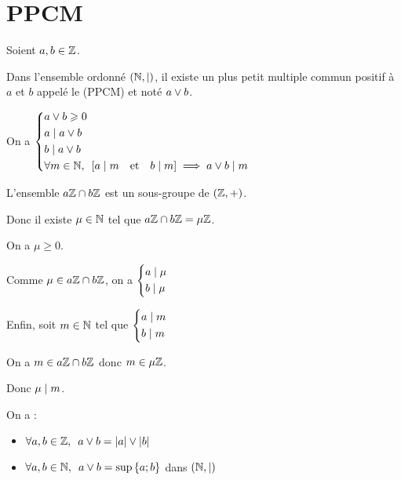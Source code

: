 \section{PPCM}

\begin{defprop}
Soient \(a,b\in\mathbb{Z}\).

Dans l'ensemble ordonné \(\groupe{\N}[\divise]\), il existe un plus petit multiple commun positif à \(a\) et \(b\) appelé le  (PPCM) et noté \(a\lor b\).

On a \(\begin{dcases}a\ou b\geq0 \\ a\divise a\ou b \\ b\divise a\ou b \\ \quantifs{\forall m\in\N}\croch{a\divise m\quad\text{et}\quad b\divise m}\imp a\ou b\divise m\end{dcases}\)
\end{defprop}

\begin{dem}
L'ensemble \(a\mathbb{Z}\cap b\mathbb{Z}\) est un sous-groupe de \(\groupe{\Z}\).

Donc il existe \(\mu\in\mathbb{N}\) tel que \(a\mathbb{Z}\cap b\mathbb{Z}=\mu\mathbb{Z}\).

On a \(\mu\geq0\).

Comme \(\mu\in a\mathbb{Z}\cap b\mathbb{Z}\), on a \(\begin{dcases}a\mid\mu \\ b\mid\mu\end{dcases}\)

Enfin, soit \(m\in\mathbb{N}\) tel que \(\begin{dcases}a\mid m \\ b\mid m\end{dcases}\)

On a \(m\in a\mathbb{Z}\cap b\mathbb{Z}\) donc \(m\in\mu\mathbb{Z}\).

Donc \(\mu\mid m\).
\end{dem}

\begin{rem}
On a :

\begin{itemize}
\item \(\quantifs{\forall a,b\in\Z}a\ou b=\abs{a}\ou\abs{b}\) \\

\item \(\quantifs{\forall a,b\in\N}a\ou b=\sup\accol{a;b}\) dans \(\groupe{\N}[\divise]\)
\end{itemize}
\end{rem}

